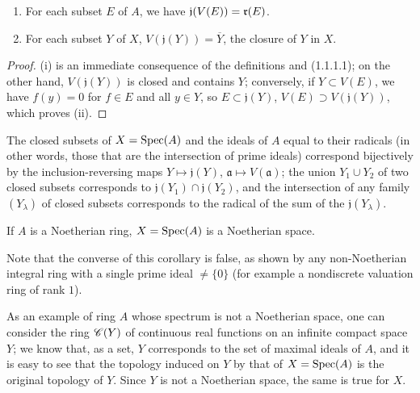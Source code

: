 \begin{proposition}[1.1.4]
\label{I.1.1.4}
\medskip\noindent
\begin{enumerate}
  \item[{\rm(i)}] For each subset $E$ of $A$, we have $\mathfrak{j}(V(E))=\mathfrak{r}(E)$.
  \item[{\rm(ii)}] For each subset $Y$ of $X$, $V(\mathfrak{j}(Y))=\overline{Y}$, the closure of $Y$ in $X$.
\end{enumerate}
\end{proposition}

\begin{proof}
\label{proof-I.1.1.4}
(i) is an immediate consequence of the definitions and (1.1.1.1);
on the other hand, $V(\mathfrak{j}(Y))$ is closed and contains $Y$;
conversely, if $Y\subset V(E)$, we have $f(y)=0$ for $f\in E$ and all $y\in Y$, so $E\subset\mathfrak{j}(Y)$, $V(E)\supset V(\mathfrak{j}(Y))$, which proves (ii).
\end{proof}

\begin{corollary}[1.1.5]
\label{I.1.1.5}
The closed subsets of $X=\operatorname{Spec}(A)$ and the ideals of $A$ equal to their radicals (in other words, those that are the intersection of prime ideals) correspond bijectively by the inclusion-reversing maps $Y\mapsto\mathfrak{j}(Y)$, $\mathfrak{a}\mapsto V(\mathfrak{a})$;
the union $Y_1\cup Y_2$ of two closed subsets corresponds to $\mathfrak{j}(Y_1)\cap\mathfrak{j}(Y_2)$, and the intersection of any family $(Y_\lambda)$ of closed subsets corresponds to the radical of the sum of the $\mathfrak{j}(Y_\lambda)$.
\end{corollary}

\begin{corollary}[1.1.6]
\label{I.1.1.6}
If $A$ is a Noetherian ring, $X=\operatorname{Spec}(A)$ is a Noetherian space.
\end{corollary}

Note that the converse of this corollary is false, as shown by any non-Noetherian integral ring with a single prime ideal $\neq\{0\}$ (for example a nondiscrete valuation ring of rank $1$).

As an example of ring $A$ whose spectrum is not a Noetherian space, one can consider the ring $\mathscr{C}(Y)$ of continuous real functions on an infinite compact space $Y$;
we know that, as a set, $Y$ corresponds to the set of maximal ideals of $A$, and it is easy to see that the topology induced on $Y$ by that of $X=\operatorname{Spec}(A)$ is the original topology of $Y$.
Since $Y$ is not a Noetherian space, the same is true for $X$.

